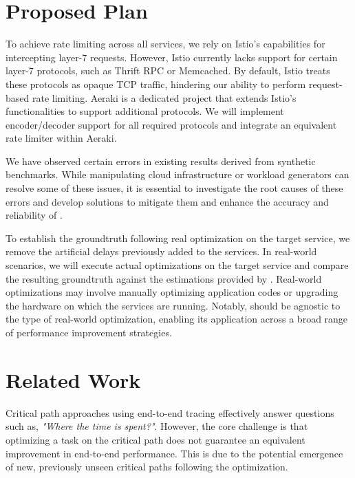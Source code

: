 \section{Proposed Plan}
To achieve rate limiting across all services, we rely on Istio's capabilities for intercepting layer-7 requests. 
However, Istio currently lacks support for certain layer-7 protocols, such as Thrift RPC or Memcached. 
By default, Istio treats these protocols as opaque TCP traffic, hindering our ability to perform request-based rate limiting.
Aeraki \cite{aeraki} is a dedicated project that extends Istio's functionalities to support additional protocols. 
We will implement encoder/decoder support for all required protocols and integrate an equivalent rate limiter within 
Aeraki. 

 We have observed certain errors in existing results derived from synthetic benchmarks. 
While manipulating cloud infrastructure or workload generators can resolve some of these issues, 
it is essential to investigate the root causes of these errors and develop solutions to mitigate 
them and enhance the accuracy and reliability of \ours.

To establish the groundtruth following real optimization on the target service, we remove the artificial delays previously added to the services. In real-world 
scenarios, we will execute actual optimizations on the target service and compare the resulting groundtruth against the estimations provided by \ours. Real-world optimizations may involve 
manually optimizing application codes or upgrading the hardware on which the services are running. Notably, \ours should be agnostic to the type of real-world optimization, 
enabling its application across a broad range of performance improvement strategies.


\section{Related Work}
Critical path approaches using end-to-end tracing \cite{mystery_machine, crisp} effectively answer questions such as, \emph{"Where the time is spent?"}.
However, the core challenge is that optimizing a task on the critical path does not guarantee an equivalent improvement in end-to-end performance. 
This is due to the potential emergence of new, previously unseen critical paths following the optimization. 

